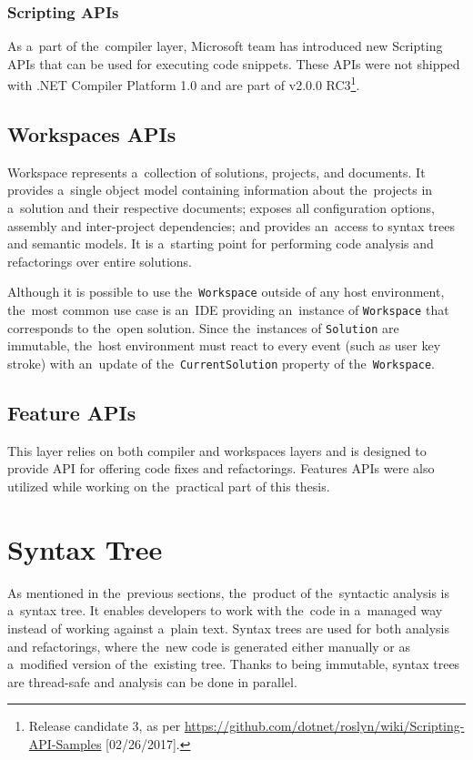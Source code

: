 \documentclass[
  digital, %
  table,   %
  lof,     %
  lot,     %
  oneside,
]{fithesis3}
\begin{document}
\subsubsection{\textbf{Scripting APIs}}
As a~part of the~compiler layer, Microsoft team has introduced new Scripting APIs that can be used for executing code snippets. These APIs were not shipped with .NET Compiler Platform 1.0 and are part of v2.0.0 RC3\footnote{Release candidate 3, as per \url{https://github.com/dotnet/roslyn/wiki/Scripting-API-Samples} [02/26/2017].}.

\subsection{Workspaces APIs}
Workspace represents a~collection of solutions, projects, and documents. It provides a~single object model containing information about the~projects in a~solution and their respective documents; exposes all configuration options, assembly and inter-project dependencies; and provides an~access to syntax trees and semantic models. It is a~starting point for performing code analysis and refactorings over entire solutions.

Although it is possible to use the~\texttt{Workspace} outside of any host environment, the~most common use case is an~IDE providing an~instance of \texttt{Workspace} that corresponds to the~open solution. Since the~instances of \texttt{Solution} are immutable, the~host environment must react to every event (such as user key stroke) with an~update of the~\texttt{CurrentSolution} property of the~\texttt{Workspace}.

\subsection{Feature APIs}
This layer relies on both compiler and workspaces layers and is designed to provide API for offering code fixes and refactorings. Features APIs were also utilized while working on the~practical part of this thesis.
  
\section{Syntax Tree}
As mentioned in the~previous sections, the~product of the~syntactic analysis is a~syntax tree. It enables developers to work with the~code in a~managed way instead of working against a~plain text. Syntax trees are used for both analysis and refactorings, where the~new code is generated either manually or as a~modified version of the~existing tree. Thanks to being immutable, syntax trees are thread-safe and analysis can be done in parallel.
\end{document}

